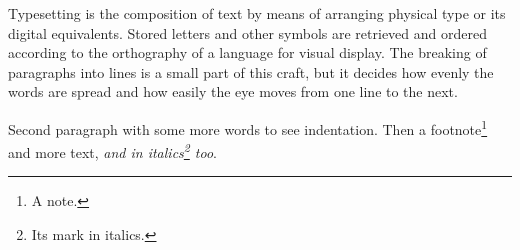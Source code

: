 \documentclass{scrartcl}
\begin{document}
Typesetting is the composition of text by means of arranging physical type or its digital equivalents. Stored letters and other symbols are retrieved and ordered according to the orthography of a language for visual display. The breaking of paragraphs into lines is a small part of this craft, but it decides how evenly the words are spread and how easily the eye moves from one line to the next.

Second paragraph with some more words to see indentation. Then a footnote\footnote{A note.} and more text, \emph{and in italics\footnote{Its mark in italics.} too}.
\end{document}
